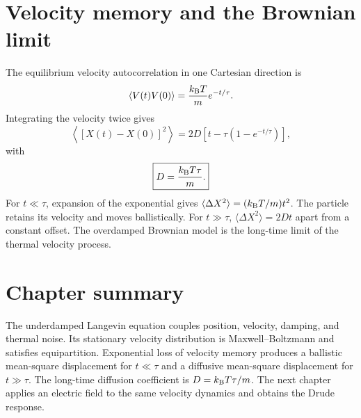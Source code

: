 \section{Velocity memory and the Brownian limit}

The equilibrium velocity autocorrelation in one Cartesian direction is
\begin{equation}
  \left\langle V(t)V(0)\right\rangle
  =\frac{k_{\mathrm B} T}{m}e^{-t/\tau}.
  \label{eq:thermal-gas-velocity-autocorrelation}
\end{equation}
Integrating the velocity twice gives
\begin{equation}
  \left\langle[X(t)-X(0)]^2\right\rangle
  =2D\left[t-\tau\left(1-e^{-t/\tau}\right)\right],
  \label{eq:thermal-gas-msd}
\end{equation}
with
\begin{equation}
  \boxed{D=\frac{k_{\mathrm B} T\tau}{m}.}
  \label{eq:thermal-gas-diffusivity}
\end{equation}
For $t\ll\tau$, expansion of the exponential gives
$\langle\Delta X^2\rangle=(k_{\mathrm B} T/m)t^2$.  The particle retains its velocity and
moves ballistically.  For $t\gg\tau$,
$\langle\Delta X^2\rangle=2Dt$ apart from a constant offset.  The overdamped
Brownian model is the long-time limit of the thermal velocity process.

\section{Chapter summary}

The underdamped Langevin equation couples position, velocity, damping, and
thermal noise.  Its stationary velocity distribution is Maxwell--Boltzmann and
satisfies equipartition.  Exponential loss of velocity memory produces a
ballistic mean-square displacement for $t\ll\tau$ and a diffusive
mean-square displacement for $t\gg\tau$.  The long-time diffusion coefficient
is $D=k_{\mathrm B} T\tau/m$.  The next chapter applies an electric field to the same
velocity dynamics and obtains the Drude response.
